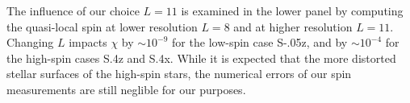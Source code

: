 \documentclass[aps,prd,amsmath,floatfix
,twocolumn
,superscriptaddress,nofootinbib,showpacs]{revtex4-1}
\theoremstyle{plain} \newtheorem{thm}{Theorem} \newtheorem{lem}{Lemma}
\begin{document}
The influence of our choice $L=11$ is examined in the lower panel by
computing the quasi-local spin at lower resolution $L=8$ and at higher
resolution $L=11$.  Changing $L$ impacts $\chi$ by $\sim 10^{-9}$ for
the low-spin case S-.05z, and by $\sim 10^{-4}$ for the high-spin
cases S.4z and S.4x.  While it is expected that the more distorted
stellar surfaces of the high-spin stars, the numerical errors of our
spin measurements are still neglible for our purposes.


\end{document}
